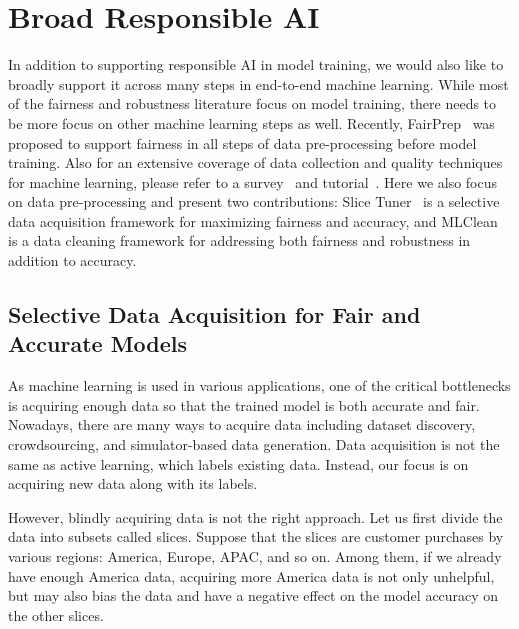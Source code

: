 \documentclass[11pt]{article}
\newcommand{\slicetuner}{Slice Tuner}
\newcommand{\frtrain}{FR-Train}
\newcommand{\mc}{MLClean}
\begin{document}


\section{Broad Responsible AI}
\label{sec:breadth}

In addition to supporting responsible AI in model training, we would also like to broadly support it across many steps in end-to-end machine learning. While most of the fairness and robustness literature focus on model training, there needs to be more focus on other machine learning steps as well. Recently, FairPrep~\cite{DBLP:conf/edbt/SchelterHKS20} was proposed to support fairness in all steps of data pre-processing before model training. Also for an extensive coverage of data collection and quality techniques for machine learning, please refer to a survey~\cite{DBLP:journals/tkde/RohHW19} and tutorial~\cite{DBLP:journals/pvldb/Whang020}.
Here we also focus on data pre-processing and present two contributions: \slicetuner{}~\cite{DBLP:journals/corr/abs-2003-04549} is a selective data acquisition framework for maximizing fairness and accuracy, and \mc{}~\cite{DBLP:conf/sigmod/TaeROKW19} is a data cleaning framework for addressing both fairness and robustness in addition to accuracy.


\subsection{Selective Data Acquisition for Fair and Accurate Models}
\label{sec:slicetuner}

As machine learning is used in various applications, one of the critical bottlenecks is acquiring enough data so that the trained model is both accurate and fair. Nowadays, there are many ways to acquire data including dataset discovery, crowdsourcing, and simulator-based data generation. Data acquisition is not the same as active learning, which labels existing data. Instead, our focus is on acquiring new data along with its labels. 

However, blindly acquiring data is not the right approach. Let us first divide the data into subsets called slices. Suppose that the slices are customer purchases by various regions: America, Europe, APAC, and so on. Among them, if we already have enough America data, acquiring more America data is not only unhelpful, but may also bias the data and have a negative effect on the model accuracy on the other slices.
\end{document}
